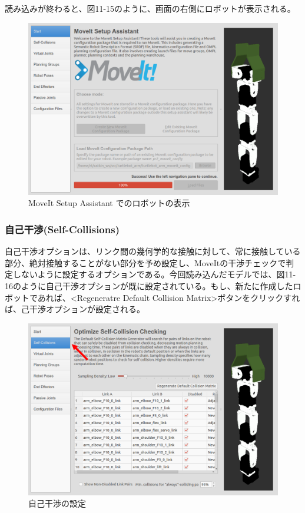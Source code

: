 読み込みが終わると、図11-15のように、画面の右側にロボットが表示される。

\begin{figure}[htp]
  \centering
  \includegraphics[width=12cm]{pictures/chapter11/pic_11_15.png}
  \caption{MoveIt Setup Assistant でのロボットの表示}
\end{figure}

\subsubsection{自己干渉(Self-Collisions)}

自己干渉オプションは、リンク間の幾何学的な接触に対して、常に接触している部分、絶対接触することがない部分を予め設定し、MoveItの干渉チェックで判定しないように設定するオプションである。今回読み込んだモデルでは、図11-16のように自己干渉オプションが既に設定されている。もし、新たに作成したロボットであれば、<Regeneratre Default Collision Matrix>ボタンをクリックすれば、己干渉オプションが設定される。

\begin{figure}[htp]
  \centering
  \includegraphics[width=12cm]{pictures/chapter11/pic_11_16.png}
  \caption{自己干渉の設定}
\end{figure}

